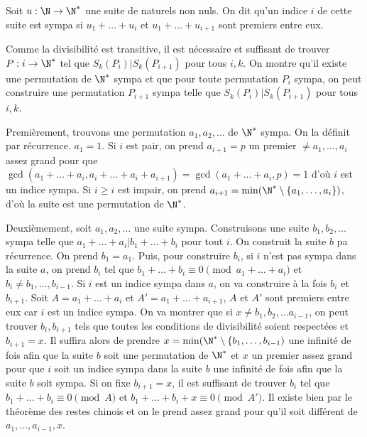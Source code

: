 Soit $ u : \N \rightarrow \N^*$ une suite de naturels non nuls. On dit qu'un indice $i$ de cette suite est sympa si $u_1 + \dots + u_i$ et $u_1 + \dots + u_{i + 1}$ sont premiers entre eux.

Comme la divisibilité est transitive, il est nécessaire et suffisant de trouver $P : i \rightarrow \N^*$ tel que $S_k(P_i) | S_k(P_{i + 1})$ pour tous $i, k$. On montre qu'il existe une permutation de $\N^*$ sympa et que pour toute permutation $P_i$ sympa, on peut construire une permutation $P_{i + 1}$ sympa telle que $S_k(P_i) | S_k(P_{i + 1})$ pour tous $i, k$.

Premièrement, trouvons une permutation $a_1, a_2, \dots$ de $\N^*$ sympa. On la définit par récurrence. $a_1 = 1$. Si $i$ est pair, on prend $a_{i + 1} = p$ un premier $\ne a_1, \dots, a_i$ assez grand pour que $\gcd(a_1 + \dots + a_i, a_i + \dots + a_i + a_{i + 1}) = \gcd(a_1 + \dots + a_i, p) = 1$ d'où $i$ est un indice sympa. Si $i \ge i$ est impair, on prend $a_{i + 1} = \min (\N^* \setminus \{a_1, \dots, a_i\})$, d'où la suite est une permutation de $\N^*$.

Deuxièmement, soit $a_1, a_2, \dots$ une suite sympa. Construisons une suite $ b_1, b_2, \dots$ sympa telle que $a_1 + \dots + a_i | b_1 + \dots + b_i$ pour tout $i$. On construit la suite $b$ pa récurrence. On prend $b_1 = a_1$. Puis, pour construire $b_i$, si $i$ n'est pas sympa dans la suite $a$, on prend $b_i$ tel que $b_1 + \dots + b_i \equiv 0 \pmod{a_1 + \dots + a_i}$ et $b_i\ne b_1, \dots, b_{i-1}$. Si $i$ est un indice sympa dans $a$, on va construire à la fois $b_i$ et $b_{i + 1}$. Soit $A = a_1 + \dots + a_i$ et $A' = a_1 + \dots + a_{i + 1}$, $A$ et $A'$ sont premiers entre eux car $i$ est un indice sympa. On va montrer que si $x\ne b_1, b_2, \dots a_{i-1}$, on peut trouver $b_i, b_{i + 1}$ tels que toutes les conditions de divisibilité soient respectées et $b_{i + 1} = x$. Il suffira alors de prendre $x = \min(\N^*\setminus \{b_1, \dots, b_{i-1})$ une infinité de fois afin que la suite $b$ soit une permutation de $\N^*$ et $x$ un premier assez grand pour que $i$ soit un indice sympa dans la suite $b$ une infinité de fois afin que la suite $b$ soit sympa. Si on fixe $b_{i + 1} = x$, il est suffisant de trouver $b_i$ tel que $b_1 + \dots + b_i\equiv 0 \pmod A$ et $b_1 + \dots + b_i + x\equiv 0\pmod{A'}$. Il existe bien par le théorème des restes chinois et on le prend assez grand pour qu'il soit différent de $a_1, \dots, a_{i - 1}, x$.